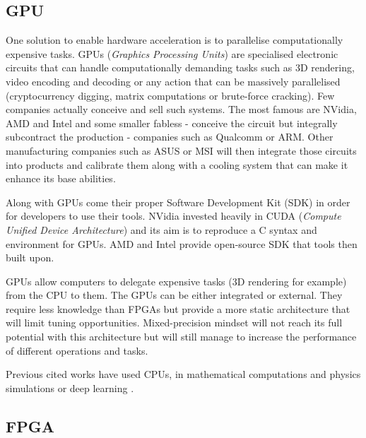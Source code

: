 
\subsection{GPU}

One solution to enable hardware acceleration is to parallelise computationally expensive tasks. GPUs (\emph{Graphics Processing Units}) are specialised electronic circuits that can handle computationally demanding tasks such as 3D rendering, video encoding and decoding or any action that can be massively parallelised (cryptocurrency digging, matrix computations or brute-force cracking). Few companies actually conceive and sell such systems. The most famous are NVidia, AMD and Intel and some smaller fabless - conceive the circuit but integrally subcontract the production -  companies such as Qualcomm or ARM. Other manufacturing companies such as ASUS or MSI will then integrate those circuits into products and calibrate them along with a cooling system that can make it enhance its base abilities.

Along with GPUs come their proper Software Development Kit (SDK) in order for developers to use their tools. NVidia invested heavily in CUDA (\emph{Compute Unified Device Architecture}) \cite{CUDA} and its aim is to reproduce a C syntax and environment for GPUs. AMD and Intel provide open-source SDK that tools then built upon.

GPUs allow computers to delegate expensive tasks (3D rendering for example) from the CPU to them. The GPUs can be either integrated or external. They require less knowledge than FPGAs but provide a more static architecture that will limit tuning opportunities. Mixed-precision mindset will not reach its full potential with this architecture but will still manage to increase the performance of different operations and tasks.

Previous cited works have used CPUs, in mathematical computations and physics simulations \cite{Goddeke2007, Baboulin2009, Clark2010, LeGrand2013, Haidar2018, Ichimura2018} or deep learning \cite{Godekke2007, Baboulin2009, Micikevicius2017, Jia2018, Ichimura2018}.


\subsection{FPGA}

